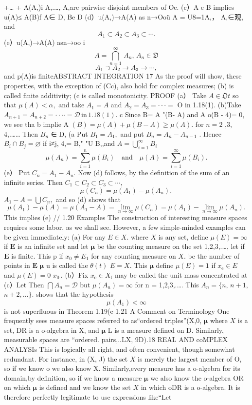 +… + A(A,)i A,.…, A,are pairwise disjoint members of Oe. (c）A e B implies u(A)≤ A(B)f A∈ D, Be D (d）u(A,)→A(A) as n→Ooü A = U8=1A,， A,∈观, and $$ A_{1}\subset A_{2}\subset A_{3}\subset\cdots. $$ (e）u(A,)→A(A) asn→oo i $$ A=\bigcap_{n=1}^{\infty}\,A_{n},\,A_{n}\in\mathfrak{D} $$ $$ A_{1}\supset A_{2}\to A_{3}\to\cdots, $$ and p(A)is finiteABSTRACT INTEGRATION 17 As the proof will show, these properties, with the exception of (Cc), also hold for complex measures; (b) is called finite additivity; (c is called monotonicity. PROOF (a） Take $A\in\mathfrak{O}t$ so that $\mu(A)<\alpha,$ and take $A_{1}=A$ and $A_{2}=A_{3}=\cdot\cdot\cdot=$ O in 1.18(1). (b)Take $A_{n+1}=A_{n+2}=\cdot\cdot\cdot\cdot=\mathcal{D}\,\mathrm{in}\,1.18(1).$ c Since B= A "(B- A) and A o(B - 4)= 0, we see tha b implie A $(B)=\mu(A)+\mu(B-A)\geq\mu(A).$ for $\textstyle n=2$ ,3, 4,.…… Then $B_{n}$ ∈ D, (a Put $B_{1}=A_{1},$ and put $B_{n}=A_{n}-A_{n-1}$ . Hence $B_{i}\cap B_{j}=\varnothing$ if i≠j, 4,= B," "U B,,and $A=\bigcup_{i=1}^{\infty}B_{i}$ $$ \mu(A_{n})=\sum_{i=1}^{n}\mu(B_{i})\quad{\mathrm{and}}\quad\mu(A)=\sum_{i=1}^{\infty}\mu(B_{i}). $$ (e） Put $C_{n}=A_{1}-A_{n}.$ Now (d) follows, by the definition of the sum of an infinite series. Then $C_{1}\subset C_{2}\subset C_{3}\subset\cdots,$ $$ \mu(C_{n})=\mu(A_{1})-\mu(A_{n}), $$ $A_{1}-A=\bigcup C_{n},$ and so (d) shows that $$ \mu(A_{1})-\mu(A)=\mu(A_{1}-A)=\operatorname*{lim}_{n\to\infty}\mu(C_{n})=\mu(A_{1})-\operatorname*{lim}_{n\to\infty}\mu(A_{n}). $$ This implies (e) // 1.20 Examples The construction of interesting measure spaces requires some labor, as we shall see. However, a few simple-minded examples can be given immediately: (a) For any $E\in X.$ where $\textstyle X$ is any set, define $\mu(E)=\infty$ if $\boldsymbol{E}$ is an infinite set and let ${\boldsymbol{\mu}}$ be the counting measure on the set {1,2,3,.…}, let if $\boldsymbol{E}$ is finite. This p if $x_{0}\neq E_{1}$ for any counting measure on $X.$ be the number of points in $\boldsymbol{E}$ ${\boldsymbol{\mu}}$ u is called the $\scriptstyle{\theta(t)}$ $E=X.$ This $\boldsymbol{\mu}$ define $\mu(E)=1$ if $x_{\mathrm{e}}\in E$ and $\mu(E)=0$ $x_{0}\,.$ (b）Fix $x_{\mathrm{e}}\in X_{\mathrm{f}}$ may be called the unit mass concentrated at (c）Let Then $\bigcap A_{n}={\mathcal{D}}$ but $\mu(A_{n})=\infty$ for n = 1,2,3,.…. This $A_{n}=\{n,\,n+1,$ $n+2,\ldots\}.$ shows that the hypothesis $$ \mu(A_{1})<\infty $$ is not superfluous in Theorem 1.19(e 1.21 A Comment on Terminology One frequently sees measure spaces referred to as“ordered triples”(X,0, $\boldsymbol{\mu}$ where $X$ is a set, DR is a o-algebra in X, and ${\boldsymbol{\mu}}$ L is a measure defined on D. Similarly, measurable spaces are “ordered. pairs,..LX, 9D).18 REAL AND coMPLEX ANALYSIs This is logically all right, and often convenient, though somewhat redundant. For instance, in (X, J) the set $X$ is merely the largest member of O, so if we know o we also know X. Similarly,every measure has a o-algebra for its domain,by definition, so if we know a measure ${\boldsymbol{\mu}}$ we also know the o-algebra OR on which $\boldsymbol{\mu}$ is defined and we know the set $X$ in which oDR is a o-algebra. It is therefore perfectly legitimate to use expressions like“Let 